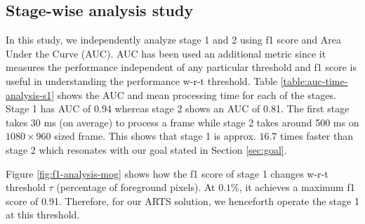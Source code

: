 \vspace{5pt}
\subsection{Stage-wise analysis study}
In this study, we independently analyze stage 1 and 2 using f1 score and Area Under the Curve (AUC). AUC has been used an additional metric since it measures the performance independent of any particular threshold and f1 score is useful in understanding the performance w-r-t threshold.  
Table \ref{table:auc-time-analysis-s1} shows the AUC and mean processing time for each of the stages. Stage 1 has AUC of 0.94 whereas stage 2 shows an AUC of 0.81. The first stage takes 30 ms  (on average) to process a frame while stage 2 takes around 500 ms on $1080 \times 960$ sized frame. This shows that stage 1 is approx. $16.7$ times faster than stage 2 which resonates with our goal stated in Section \ref{sec:goal}. 

Figure \ref{fig:f1-analysis-mog} shows how the f1 score of stage 1 changes w-r-t threshold $\tau$ (percentage of foreground pixels). At $0.1\%$, it achieves a maximum f1 score of 0.91. Therefore, for our ARTS solution, we henceforth operate the stage 1 at this threshold.

